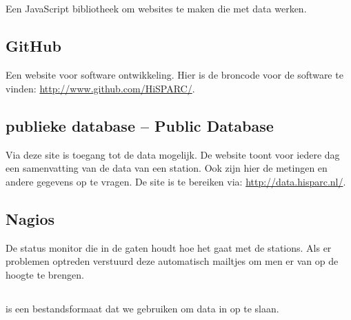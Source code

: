 \subsection{\jsparc}

Een JavaScript bibliotheek om websites te maken die met \hisparc data
werken.


\subsection{GitHub}

Een website voor software ontwikkeling. Hier is de broncode voor de
\hisparc software te vinden: \url{http://www.github.com/HiSPARC/}.


\subsection{\hisparc publieke database -- \hisparc Public Database}

Via deze site is toegang tot de \hisparc data mogelijk. De website toont
voor iedere dag een samenvatting van de data van een station. Ook zijn
hier de metingen en andere gegevens op te vragen. De site is te bereiken
via: \url{http://data.hisparc.nl/}.


\subsection{Nagios}

De status monitor die in de gaten houdt hoe het gaat met de stations.
Als er problemen optreden verstuurd deze automatisch mailtjes om men er
van op de hoogte te brengen.


\subsection{\hdf}

\hdf is een bestandsformaat dat we gebruiken om data in op te slaan.



